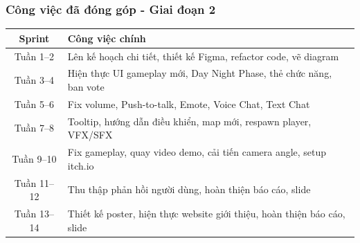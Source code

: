 \begin{frame}
\frametitle{Công việc đã đóng góp - Giai đoạn 2}
\begin{table}[H]
\centering
\renewcommand{\arraystretch}{1.2}
\small
\begin{tabular}{|c|l|}
\hline
\textbf{Sprint} & \textbf{Công việc chính} \\ \hline

Tuần 1--2 & Lên kế hoạch chi tiết, thiết kế Figma, refactor code, vẽ diagram \\ \hline

Tuần 3--4 & Hiện thực UI gameplay mới, Day Night Phase, thẻ chức năng, ban vote \\ \hline

Tuần 5--6 & Fix volume, Push-to-talk, Emote, Voice Chat, Text Chat \\ \hline

Tuần 7--8 & Tooltip, hướng dẫn điều khiển, map mới, respawn player, VFX/SFX \\ \hline

Tuần 9--10 & Fix gameplay, quay video demo, cải tiến camera angle, setup itch.io \\ \hline

Tuần 11--12 & Thu thập phản hồi người dùng, hoàn thiện báo cáo, slide \\ \hline

Tuần 13--14 & Thiết kế poster, hiện thực website giới thiệu, hoàn thiện báo cáo, slide \\ \hline
\end{tabular}
\end{table}
\end{frame}






